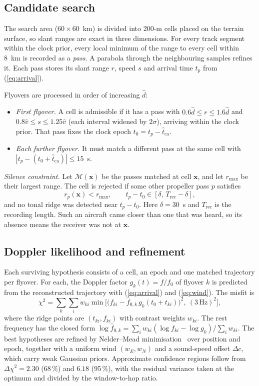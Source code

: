 \documentclass[10pt,twocolumn,letterpaper]{article}
\newcommand{\ca}{\mathrm{ca}}
\begin{document}
\subsection{Candidate search}\label{sec:search}
The search area ($60\times60$~km) is divided into 200-m cells placed on the terrain surface, so slant ranges are
exact in three dimensions. For every track segment within the clock prior, every local minimum of the range to every
cell within 8~km is recorded as a \emph{pass}. A parabola through the neighbouring samples refines it. Each pass
stores its slant range $r$, speed $s$ and arrival time $t_p$ from (\ref{eq:arrival}).

Flyovers are processed in order of increasing $\hat d$:
\begin{itemize}
\item \emph{First flyover.} A cell is admissible if it has a pass with $0.6\hat d\le r\le1.6\hat d$ and
  $0.8\hat v\le s\le1.25\hat v$ (each interval widened by $2\sigma$), arriving within the clock prior. That pass fixes
  the clock epoch $t_0=t_p-\hat t_\ca$.
\item \emph{Each further flyover.} It must match a different pass at the same cell with
  $|t_p-(t_0+\hat t_\ca)|\le15$~s.
\end{itemize}

\emph{Silence constraint.} Let $\mathcal{M}(\mathbf{x})$ be the passes matched at cell $\mathbf{x}$, and let
$r_{\max}$ be their largest range. The cell is rejected if some other propeller pass $p$ satisfies
\begin{equation}
r_p(\mathbf{x}) < r_{\max}, \qquad t_p-t_0\in[\delta,\,T_\mathrm{rec}-\delta],\label{eq:silence}
\end{equation}
and no tonal ridge was detected near $t_p - t_0$. Here $\delta=30$~s and $T_\mathrm{rec}$ is the recording length.
Such an aircraft came closer than one that was heard, so its absence means the receiver was not at $\mathbf{x}$.

\subsection{Doppler likelihood and refinement}
Each surviving hypothesis consists of a cell, an epoch and one matched trajectory per flyover. For each, the Doppler
factor $g_k(t)=f/f_0$ of flyover $k$ is predicted from the reconstructed trajectory with (\ref{eq:arrival}) and
(\ref{eq:wind}). The misfit is
\begin{equation}
\chi^2 = \sum_k\sum_i w_{ki}\min\!\Big[\big(f_{ki}-\hat f_{0,k}\,g_k(t_0+t_{ki})\big)^2,\ (3\,\mathrm{Hz})^2\Big],\label{eq:chi2}
\end{equation}
where the ridge points are $(t_{ki}, f_{ki})$ with contrast weights $w_{ki}$. The rest frequency has the closed form
$\log\hat f_{0,k}=\sum_i w_{ki}(\log f_{ki}-\log g_k)/\sum_i w_{ki}$. The best hypotheses are refined by Nelder--Mead
minimisation~\cite{neldermead1965} over position and epoch, together with a uniform wind $(w_E,w_N)$ and a
sound-speed offset $\Delta c$, which carry weak Gaussian priors. Approximate confidence regions follow from
$\Delta\chi^2=2.30$ (68\,\%) and $6.18$ (95\,\%), with the residual variance taken at the optimum and divided by the
window-to-hop ratio.
\end{document}
